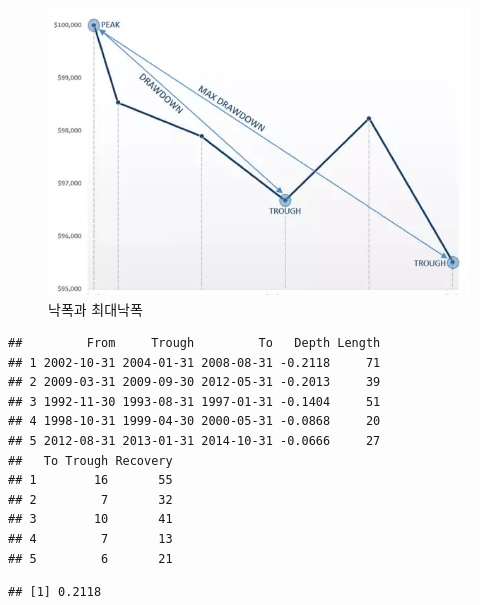 \documentclass[12pt,]{book}
\newenvironment{Shaded}{\begin{snugshade}}{\end{snugshade}}
\newcommand{\KeywordTok}[1]{\textcolor[rgb]{0.13,0.29,0.53}{\textbf{#1}}}
\newcommand{\NormalTok}[1]{#1}
\newcommand{\OperatorTok}[1]{\textcolor[rgb]{0.81,0.36,0.00}{\textbf{#1}}}
\begin{document}
\begin{figure}[h]

{\centering \includegraphics[width=0.7\linewidth]{images/drawdown} 

}

\caption{낙폭과 최대낙폭}\label{fig:unnamed-chunk-9}
\end{figure}

\begin{Shaded}
\end{Shaded}

\begin{verbatim}
##         From     Trough         To   Depth Length
## 1 2002-10-31 2004-01-31 2008-08-31 -0.2118     71
## 2 2009-03-31 2009-09-30 2012-05-31 -0.2013     39
## 3 1992-11-30 1993-08-31 1997-01-31 -0.1404     51
## 4 1998-10-31 1999-04-30 2000-05-31 -0.0868     20
## 5 2012-08-31 2013-01-31 2014-10-31 -0.0666     27
##   To Trough Recovery
## 1        16       55
## 2         7       32
## 3        10       41
## 4         7       13
## 5         6       21
\end{verbatim}

\begin{Shaded}
\end{Shaded}

\begin{verbatim}
## [1] 0.2118
\end{verbatim}

\begin{Shaded}
\end{Shaded}
\end{document}
